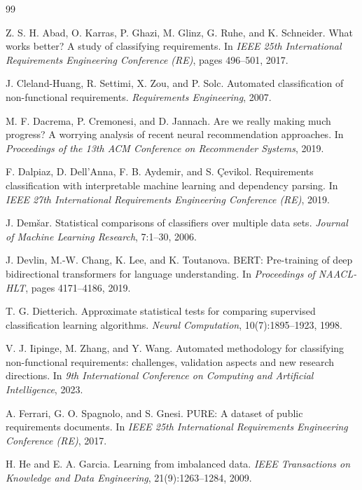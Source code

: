 \documentclass[11pt,a4paper]{article}
\begin{document}
\begin{thebibliography}{99}\small

 Z. S. H. Abad, O. Karras, P. Ghazi, M. Glinz, G. Ruhe, and K. Schneider.
What works better? A study of classifying requirements. In \emph{IEEE 25th International
Requirements Engineering Conference (RE)}, pages 496--501, 2017.

 J. Cleland-Huang, R. Settimi, X. Zou, and P. Solc. Automated
classification of non-functional requirements. \emph{Requirements Engineering}, 2007.

 M. F. Dacrema, P. Cremonesi, and D. Jannach. Are we really making
much progress? A worrying analysis of recent neural recommendation approaches. In
\emph{Proceedings of the 13th ACM Conference on Recommender Systems}, 2019.

 F. Dalpiaz, D. Dell'Anna, F. B. Aydemir, and S. Çevikol.
Requirements classification with interpretable machine learning and dependency parsing. In
\emph{IEEE 27th International Requirements Engineering Conference (RE)}, 2019.

 J. Demšar. Statistical comparisons of classifiers over multiple data
sets. \emph{Journal of Machine Learning Research}, 7:1--30, 2006.

 J. Devlin, M.-W. Chang, K. Lee, and K. Toutanova. BERT: Pre-training
of deep bidirectional transformers for language understanding. In \emph{Proceedings of
NAACL-HLT}, pages 4171--4186, 2019.

 T. G. Dietterich. Approximate statistical tests for comparing
supervised classification learning algorithms. \emph{Neural Computation},
10(7):1895--1923, 1998.

 V. J. Iipinge, M. Zhang, and Y. Wang. Automated methodology for
classifying non-functional requirements: challenges, validation aspects and new research
directions. In \emph{9th International Conference on Computing and Artificial Intelligence},
2023.

 A. Ferrari, G. O. Spagnolo, and S. Gnesi. PURE: A dataset of public
requirements documents. In \emph{IEEE 25th International Requirements Engineering
Conference (RE)}, 2017.

 H. He and E. A. Garcia. Learning from imbalanced data. \emph{IEEE
Transactions on Knowledge and Data Engineering}, 21(9):1263--1284, 2009.


\end{thebibliography}
\end{document}
